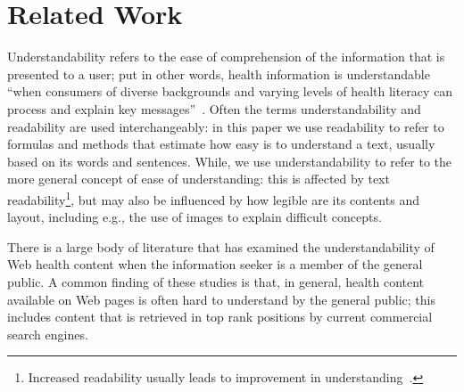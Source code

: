 %
%

\section{Related Work}
\label{sec:related}
Understandability refers to the ease of comprehension of the information that is presented to a user; put in other words, health information is understandable ``when consumers of diverse backgrounds and varying levels of health literacy can process and explain key messages''~\cite{shoemaker2014development}. Often the terms understandability and readability are used interchangeably: in this paper we use readability to refer to formulas and methods that estimate how easy is to understand a text, usually based on its words and sentences. While, we use understandability to refer to the more general concept of ease of understanding: this is affected by text readability\footnote{Increased readability usually leads to improvement in understanding~\cite{ley1996use}.}, but may also be influenced by how legible are its contents and layout, including e.g., the use of images to explain difficult concepts.

There is a large body of literature that has examined the understandability of Web health content when the information seeker is a member of the general public. 
A common finding of these studies is that, in general, health content available on Web pages is often hard to understand by the general public; this includes content that is retrieved in top rank positions by current commercial search engines.

